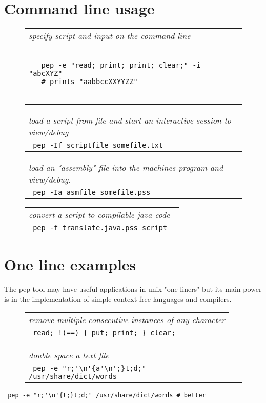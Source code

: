 \documentclass[a4paper,12pt]{article}
\begin{document}
\section{Command line usage}
 \begin{figure}
 \begin{tabular}{ l }
 \emph{ specify script and input on the command line  } \\ 
 \begin{lstlisting}[breaklines] 

   pep -e "read; print; print; clear;" -i "abcXYZ"  
   # prints "aabbccXXYYZZ"
  
 \end{lstlisting} 
 \end{tabular} 

 \end{figure}
 \begin{figure}
 \begin{tabular}{ l }
 \emph{ load a script from file and start an interactive session to view/debug  } \\ 
 \verb| pep -If scriptfile somefile.txt |
 \end{tabular} 
 \end{figure}
 \begin{figure}
 \begin{tabular}{ l }
 \emph{ load an "assembly" file into the machines program and view/debug.  } \\ 
 \verb| pep -Ia asmfile somefile.pss |
 \end{tabular} 
 \end{figure}
 \begin{figure}
 \begin{tabular}{ l }
 \emph{ convert a script to compilable java code } \\ 
 \verb| pep -f translate.java.pss script  |
 \end{tabular} 
 \end{figure}
  
\section{One line examples}

  The pep tool may have useful applications in unix "one-liners" but
  its main power is in the implementation of simple context free
  languages and compilers.
 \begin{figure}
 \begin{tabular}{ l }
 \emph{ remove multiple consecutive instances of any character } \\ 
 \verb| read; !(==) { put; print; } clear; |
 \end{tabular} 
 \end{figure}
 \begin{figure}
 \begin{tabular}{ l }
 \emph{ double space a text file } \\ 
 \verb| pep -e "r;'\n'{a'\n';}t;d;" /usr/share/dict/words  |
 \end{tabular} 
 \end{figure} 
 \verb| pep -e "r;'\n'{t;}t;d;" /usr/share/dict/words # better |
\end{document}
